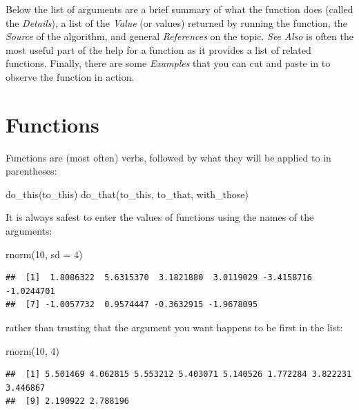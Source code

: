 \documentclass[
]{book}
\newenvironment{Shaded}{\begin{snugshade}}{\end{snugshade}}
\newcommand{\AttributeTok}[1]{\textcolor[rgb]{0.77,0.63,0.00}{#1}}
\newcommand{\DecValTok}[1]{\textcolor[rgb]{0.00,0.00,0.81}{#1}}
\newcommand{\FunctionTok}[1]{\textcolor[rgb]{0.00,0.00,0.00}{#1}}
\newcommand{\NormalTok}[1]{#1}
\begin{document}
Below the list of arguments are a brief summary of what the function does (called the \emph{Details}), a list of the \emph{Value} (or values) returned by running the function, the \emph{Source} of the algorithm, and general \emph{References} on the topic. \emph{See Also} is often the most useful part of the help for a function as it provides a list of related functions. Finally, there are some \emph{Examples} that you can cut and paste in to observe the function in action.

\hypertarget{functions}{%
\section{Functions}\label{functions}}

Functions are (most often) verbs, followed by what they will be applied to in parentheses:

\begin{Shaded}
\begin{Highlighting}[]
\FunctionTok{do\_this}\NormalTok{(to\_this)}
\FunctionTok{do\_that}\NormalTok{(to\_this, to\_that, with\_those)}
\end{Highlighting}
\end{Shaded}

It is always safest to enter the values of functions using the names of the arguments:

\begin{Shaded}
\begin{Highlighting}[]
\FunctionTok{rnorm}\NormalTok{(}\DecValTok{10}\NormalTok{, }\AttributeTok{sd =} \DecValTok{4}\NormalTok{)}
\end{Highlighting}
\end{Shaded}

\begin{verbatim}
##  [1]  1.8086322  5.6315370  3.1821880  3.0119029 -3.4158716 -1.0244701
##  [7] -1.0057732  0.9574447 -0.3632915 -1.9678095
\end{verbatim}

rather than trusting that the argument you want happens to be first in the list:

\begin{Shaded}
\begin{Highlighting}[]
\FunctionTok{rnorm}\NormalTok{(}\DecValTok{10}\NormalTok{, }\DecValTok{4}\NormalTok{)}
\end{Highlighting}
\end{Shaded}

\begin{verbatim}
##  [1] 5.501469 4.062815 5.553212 5.403071 5.140526 1.772284 3.822231 3.446867
##  [9] 2.190922 2.788196
\end{verbatim}
\end{document}
